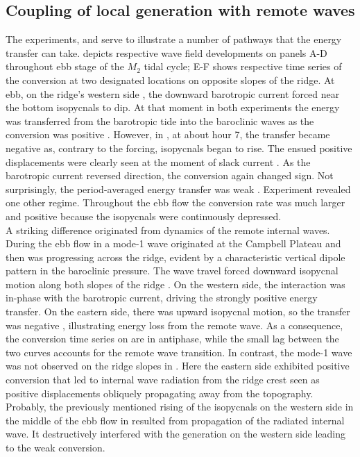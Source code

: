 \documentclass[12pt]{article}
\begin{document}
\subsection{Coupling of local generation with remote waves}
\label{C3.sec:amp_mech}
The experiments,  and  serve to illustrate a number of pathways that the 
energy transfer can take.  depicts respective wave field 
developments on panels A-D throughout ebb stage of the $M_2$ tidal cycle; E-F shows respective time 
series of the conversion at two designated locations on opposite slopes of the ridge. At 
ebb, on the ridge's western side , the downward barotropic current 
forced near the bottom isopycnals to dip. At that moment in both experiments the energy was 
transferred 
from 
the barotropic tide into the baroclinic waves as the conversion was positive 
. However, in , at about hour 7, the 
transfer became negative as, contrary to the forcing, isopycnals began to rise. The ensued  
positive displacements were clearly seen at the moment of slack current . 
As the 
barotropic current reversed direction, the conversion again changed sign. Not surprisingly, the 
period-averaged energy transfer was weak . Experiment  
revealed one other regime. Throughout the ebb flow the conversion rate was much larger and positive 
because the isopycnals were continuously depressed.\\

A striking difference originated from dynamics of the remote internal waves. During the ebb flow 
in  a mode-1 wave originated at the Campbell Plateau and then was progressing across 
the ridge, 
evident by a characteristic vertical dipole pattern in the baroclinic pressure. The wave 
travel forced downward isopycnal motion along both slopes of the ridge . 
On the western side, the 
interaction was in-phase with the barotropic current, driving the strongly positive energy 
transfer. On the eastern side, there was upward isopycnal motion, so the transfer was negative 
, illustrating energy loss from the remote wave. As a consequence, the 
conversion time series on  are in antiphase, while the 
small lag between the two curves accounts for the remote wave transition.
In contrast, the 
mode-1 wave was not observed on the ridge slopes in . Here the eastern side exhibited 
positive 
conversion that led to internal wave radiation from the ridge crest  seen 
as positive displacements obliquely propagating away from the topography. 
Probably, the previously mentioned rising of the isopycnals on the western side  
in the middle of the ebb flow in  resulted from propagation of the 
radiated internal wave. It destructively interfered with the generation on the western side 
leading to the weak conversion.\\
\end{document}
